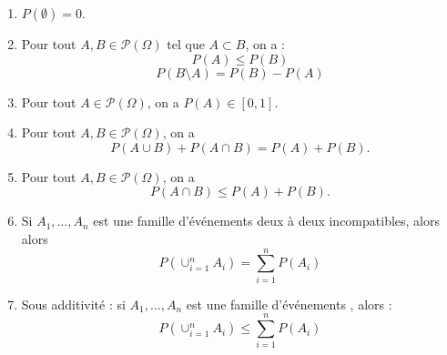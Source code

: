 \documentclass{book}
\begin{document}
\begin{Proposition}
\begin{enumerate}
\item $ P(\emptyset)=0.$
\item Pour tout $A,B\in \mathcal{P}(\Omega)$ tel que  $A\subset B$, on a :
$$P(A)\leq P(B)$$
$$P(B\setminus A )=P(B)-P(A)$$
\item Pour tout $A\in \mathcal{P}(\Omega)$, on a $P(A)\in[0,1]$.
\item Pour tout $A,B\in \mathcal{P}(\Omega)$, on a $$P(A\cup B)+P(A\cap B)=P(A)+P(B).$$
\item Pour tout $A,B\in \mathcal{P}(\Omega)$, on a $$P(A\cap B)\leq P(A)+P(B).$$
\item Si $A_1, \dots, A_n$ est une famille d'événements deux à deux incompatibles, alors
alors \[ P\left( \cup_{i=1}^n A_i \right) = \sum_{i=1}^n P(A_i) \]
\item Sous additivité : si $A_1, \dots, A_n$ est une famille d'événements , alors  :
\[ P\left( \cup_{i=1}^n A_i \right) \leq  \sum_{i=1}^n P(A_i) \]
\end{enumerate}
\end{Proposition}
\end{document}
